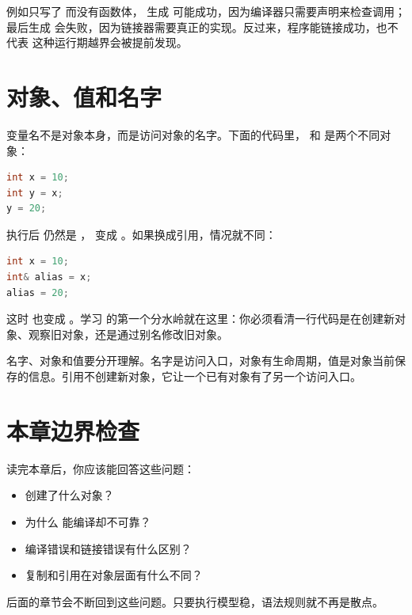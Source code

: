 例如只写了  而没有函数体， 生成  可能成功，因为编译器只需要声明来检查调用；最后生成  会失败，因为链接器需要真正的实现。反过来，程序能链接成功，也不代表  这种运行期越界会被提前发现。

\section{对象、值和名字}

变量名不是对象本身，而是访问对象的名字。下面的代码里， 和  是两个不同对象：

\begin{lstlisting}[language=C++,caption={复制会产生新对象}]
int x = 10;
int y = x;
y = 20;
\end{lstlisting}

执行后  仍然是 ， 变成 。如果换成引用，情况就不同：

\begin{lstlisting}[language=C++,caption={引用是已有对象的别名}]
int x = 10;
int& alias = x;
alias = 20;
\end{lstlisting}

这时  也变成 。学习 \cpp 的第一个分水岭就在这里：你必须看清一行代码是在创建新对象、观察旧对象，还是通过别名修改旧对象。

\begin{keyidea}
名字、对象和值要分开理解。名字是访问入口，对象有生命周期，值是对象当前保存的信息。引用不创建新对象，它让一个已有对象有了另一个访问入口。
\end{keyidea}

\section{本章边界检查}

读完本章后，你应该能回答这些问题：

\begin{itemize}
  \item {} 创建了什么对象？
  \item 为什么  能编译却不可靠？
  \item 编译错误和链接错误有什么区别？
  \item 复制和引用在对象层面有什么不同？
\end{itemize}

后面的章节会不断回到这些问题。只要执行模型稳，语法规则就不再是散点。

